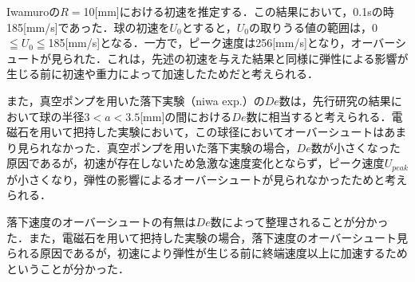 Iwamuro\cite{ref:9}の$R =$10[mm]における初速を推定する．この結果において，0.1sの時185[mm/s]であった．球の初速を$U_0$とすると，$U_0$の取りうる値の範囲は，0$\leqq U_0 \leqq$185[mm/s]となる．一方で，ピーク速度は256[mm/s]となり，オーバーシュートが見られた．これは，先述の初速を与えた結果と同様に弾性による影響が生じる前に初速や重力によって加速したためだと考えられる．

また，真空ポンプを用いた落下実験（niwa exp.）の$De$数は，先行研究の結果において球の半径$3<a<3.5$[mm]の間における$De$数に相当すると考えられる．電磁石を用いて把持した実験において，この球径においてオーバーシュートはあまり見られなかった．真空ポンプを用いた落下実験の場合，$De$数が小さくなった原因であるが，初速が存在しないため急激な速度変化とならず，ピーク速度$U_{peak}$が小さくなり，弾性の影響によるオーバーシュートが見られなかったためと考えられる．

落下速度のオーバーシュートの有無は$De$数によって整理されることが分かった．また，電磁石を用いて把持した実験の場合，落下速度のオーバーシュート見られる原因であるが，初速により弾性が生じる前に終端速度以上に加速するためということが分かった．

